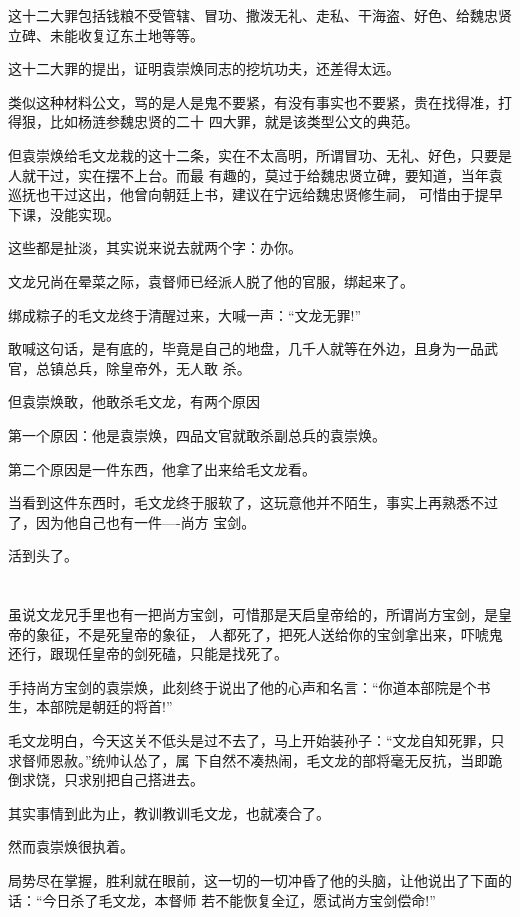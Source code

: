 \documentclass[11pt,a4paper,onecolumn]{article}
\begin{document}
这十二大罪包括钱粮不受管辖、冒功、撒泼无礼、走私、干海盗、好色、给魏忠贤立碑、未能收复辽东土地等等。

这十二大罪的提出，证明袁崇焕同志的挖坑功夫，还差得太远。

类似这种材料公文，骂的是人是鬼不要紧，有没有事实也不要紧，贵在找得准，打得狠，比如杨涟参魏忠贤的二十
四大罪，就是该类型公文的典范。

但袁崇焕给毛文龙栽的这十二条，实在不太高明，所谓冒功、无礼、好色，只要是人就干过，实在摆不上台。而最
有趣的，莫过于给魏忠贤立碑，要知道，当年袁巡抚也干过这出，他曾向朝廷上书，建议在宁远给魏忠贤修生祠，
可惜由于提早下课，没能实现。

这些都是扯淡，其实说来说去就两个字：办你。

文龙兄尚在晕菜之际，袁督师已经派人脱了他的官服，绑起来了。

绑成粽子的毛文龙终于清醒过来，大喊一声：``文龙无罪!''

敢喊这句话，是有底的，毕竟是自己的地盘，几千人就等在外边，且身为一品武官，总镇总兵，除皇帝外，无人敢
杀。

但袁崇焕敢，他敢杀毛文龙，有两个原因

第一个原因：他是袁崇焕，四品文官就敢杀副总兵的袁崇焕。

第二个原因是一件东西，他拿了出来给毛文龙看。

当看到这件东西时，毛文龙终于服软了，这玩意他并不陌生，事实上再熟悉不过了，因为他自己也有一件----尚方
宝剑。

活到头了。

\section[\thesection]{}

虽说文龙兄手里也有一把尚方宝剑，可惜那是天启皇帝给的，所谓尚方宝剑，是皇帝的象征，不是死皇帝的象征，
人都死了，把死人送给你的宝剑拿出来，吓唬鬼还行，跟现任皇帝的剑死磕，只能是找死了。

手持尚方宝剑的袁崇焕，此刻终于说出了他的心声和名言：``你道本部院是个书生，本部院是朝廷的将首!''

毛文龙明白，今天这关不低头是过不去了，马上开始装孙子：``文龙自知死罪，只求督师恩赦。''统帅认怂了，属
下自然不凑热闹，毛文龙的部将毫无反抗，当即跪倒求饶，只求别把自己搭进去。

其实事情到此为止，教训教训毛文龙，也就凑合了。

然而袁崇焕很执着。

局势尽在掌握，胜利就在眼前，这一切的一切冲昏了他的头脑，让他说出了下面的话：``今日杀了毛文龙，本督师
若不能恢复全辽，愿试尚方宝剑偿命!''
\end{document}
